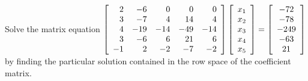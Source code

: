 \begin{Exam} Solve the matrix equation $\mtx{rrrrr}{2&-6&0&0&0\\
3&-7&4&14&4\\
4&-19&-14&-49&-14\\
3&-6&6&21&6\\
-1&2&-2&-7&-2}\vr{x_1\\x_2\\x_3\\x_4\\x_5}=\mtx{c}{-72\\-78\\-249\\-63\\21}$ by finding the particular solution contained in the row space of the coefficient matrix.\\


\end{Exam}
